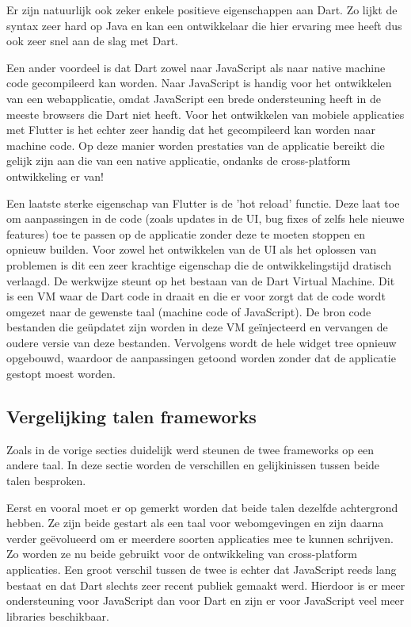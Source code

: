 Er zijn natuurlijk ook zeker enkele positieve eigenschappen aan Dart. Zo lijkt de syntax zeer hard op Java en kan een ontwikkelaar die hier ervaring mee heeft dus ook zeer snel aan de slag met Dart. 

Een ander voordeel is dat Dart zowel naar JavaScript als naar native machine code gecompileerd kan worden. Naar JavaScript is handig voor het ontwikkelen van een webapplicatie, omdat JavaScript een brede ondersteuning heeft in de meeste browsers die Dart niet heeft. Voor het ontwikkelen van mobiele applicaties met Flutter is het echter zeer handig dat het gecompileerd kan worden naar machine code. Op deze manier worden prestaties van de applicatie bereikt die gelijk zijn aan die van een native applicatie, ondanks de cross-platform ontwikkeling er van!

Een laatste sterke eigenschap van Flutter is de 'hot reload' functie. Deze laat toe om aanpassingen in de code (zoals updates in de UI, bug fixes of zelfs hele nieuwe features) toe te passen op de applicatie zonder deze te moeten stoppen en opnieuw builden. Voor zowel het ontwikkelen van de UI als het oplossen van problemen is dit een zeer krachtige eigenschap die de ontwikkelingstijd dratisch verlaagd. De werkwijze steunt op het bestaan van de Dart Virtual Machine. Dit is een VM waar de Dart code in draait en die er voor zorgt dat de code wordt omgezet naar de gewenste taal (machine code of JavaScript). De bron code bestanden die geüpdatet zijn worden in deze VM geïnjecteerd en vervangen de oudere versie van deze bestanden. Vervolgens wordt de hele widget tree opnieuw opgebouwd, waardoor de aanpassingen getoond worden zonder dat de applicatie gestopt moest worden.

\subsection{Vergelijking talen frameworks}
\label{subsubse:vglTalen}

Zoals in de vorige secties duidelijk werd steunen de twee frameworks op een andere taal. In deze sectie worden de verschillen en gelijkinissen tussen beide talen besproken.

Eerst en vooral moet er op gemerkt worden dat beide talen dezelfde achtergrond hebben. Ze zijn beide gestart als een taal voor webomgevingen en zijn daarna verder geëvolueerd om er meerdere soorten applicaties mee te kunnen schrijven. Zo worden ze nu beide gebruikt voor de ontwikkeling van cross-platform applicaties. Een groot verschil tussen de twee is echter dat JavaScript reeds lang bestaat en dat Dart slechts zeer recent publiek gemaakt werd. Hierdoor is er meer ondersteuning voor JavaScript dan voor Dart en zijn er voor JavaScript veel meer libraries beschikbaar.

